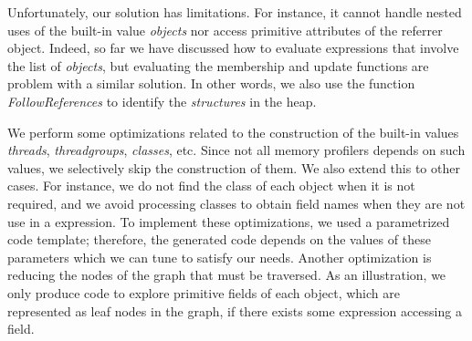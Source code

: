 Unfortunately, our solution has limitations.
For instance, it cannot handle nested uses of the built-in value \textit{objects} nor access primitive attributes of the referrer object.
Indeed, so far we have discussed how to evaluate expressions that involve the list of \textit{objects}, but evaluating the membership and update functions are problem with a similar solution.
In other words, we also use the function \textit{FollowReferences} to identify the \textit{structures} in the heap.

We perform some optimizations related to the construction of the built-in values \textit{threads}, \textit{threadgroups}, \textit{classes}, etc. 
Since not all memory profilers depends on such values, we selectively skip the construction of them.
We also extend this to other cases. For instance, we do not find the class of each object when it is not required, and we avoid processing classes to obtain field names when they are not use in a expression.
To implement these optimizations, we used a parametrized code template; therefore, the generated code depends on the values of these parameters which we can tune to satisfy our needs.
Another optimization is reducing the nodes of the graph that must be traversed.
As an illustration, we only produce code to explore primitive fields of each object, which are represented as leaf nodes in the graph, if there exists some expression accessing a field.


